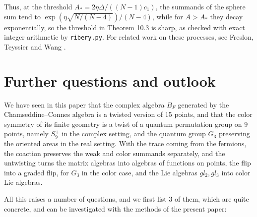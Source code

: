 \documentclass[11pt]{amsart}
\theoremstyle{definition}
\begin{document}
Thus, at the threshold $A_*=2\eta\Delta/((N-1)c_1)$, the summands of the sphere sum tend to $\exp(\eta\sqrt{N/(N-4)})/(N-4)$, while for $A>A_*$ they decay exponentially, so the threshold in Theorem 10.3 is sharp, as checked with exact integer arithmetic by {\tt ribery.py}. For related work on these processes, see Freslon, Teyssier and Wang \cite{ftw}.

\section{Further questions and outlook}

We have seen in this paper that the complex algebra $B_F$ generated by the Chamseddine--Connes algebra is a twisted version of 15 points, and that the color symmetry of its finite geometry is a twist of a quantum permutation group on 9 points, namely $S_9^+$ in the complex setting, and the quantum group $G_3$ preserving the oriented areas in the real setting. With the trace coming from the fermions, the coaction preserves the weak and color summands separately, and the untwisting turns the matrix algebras into algebras of functions on points, the flip into a graded flip, for $G_3$ in the color case, and the Lie algebras $gl_2,gl_3$ into color Lie algebras.

All this raises a number of questions, and we first list 3 of them, which are quite concrete, and can be investigated with the methods of the present paper:
\end{document}
